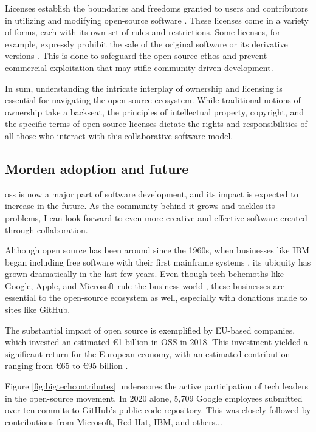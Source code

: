 Licenses establish the boundaries and freedoms granted to users and contributors in utilizing and modifying open-source software \citep{laurent2004understanding}. These licenses come in a variety of forms, each with its own set of rules and restrictions. Some licenses, for example, expressly prohibit the sale of the original software or its derivative versions \citep{madison2003reconstructing}. This is done to safeguard the open-source ethos and prevent commercial exploitation that may stifle community-driven development.

In sum, understanding the intricate interplay of ownership and licensing is essential for navigating the open-source ecosystem. While traditional notions of ownership take a backseat, the principles of intellectual property, copyright, and the specific terms of open-source licenses dictate the rights and responsibilities of all those who interact with this collaborative software model.


\subsection{Morden adoption and future}
\ac{oss} is now a major part of software development, and its impact is expected to increase in the future. As the community behind it grows and tackles its problems, I can look forward to even more creative and effective software created through collaboration.

Although open source has been around since the 1960s, when businesses like IBM began including free software with their first mainframe systems \citep{moreno2006open}, its ubiquity has grown dramatically in the last few years.  Even though tech behemoths like Google, Apple, and Microsoft rule the business world \citep{jacobides2020regulating}, these businesses are essential to the open-source ecosystem as well, especially with donations made to sites like GitHub.

The substantial impact of open source is exemplified by EU-based companies, which invested an estimated €1 billion in OSS in 2018. This investment yielded a significant return for the European economy, with an estimated contribution ranging from €65 to €95 billion \citep{blind2021impact}.

Figure \ref{fig:bigtechcontributes} underscores the active participation of tech leaders in the open-source movement.  In 2020 alone, 5,709 Google employees submitted over ten commits to GitHub's public code repository. This was closely followed by contributions from Microsoft, Red Hat, IBM, and others...

